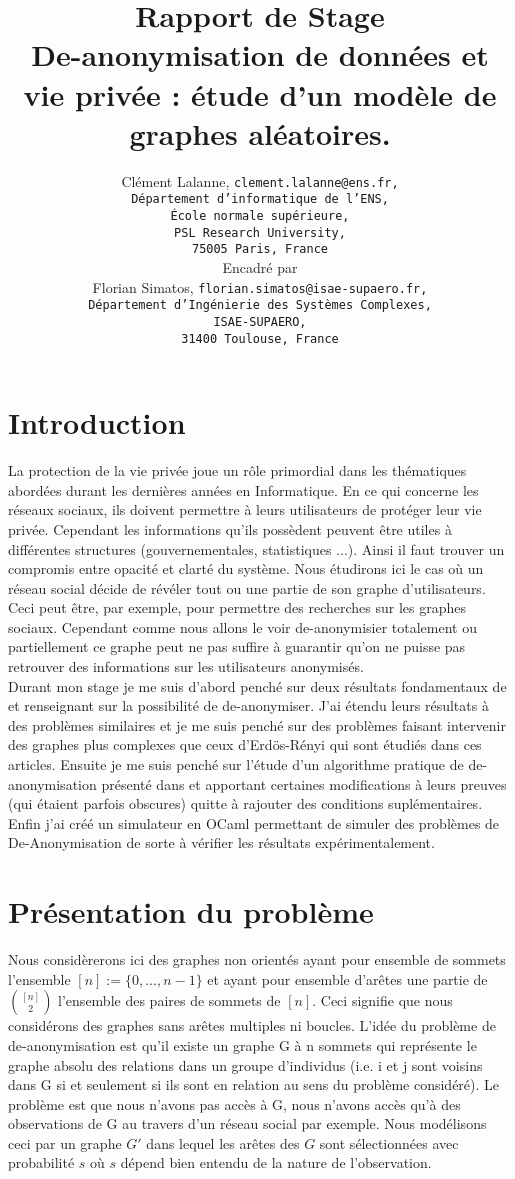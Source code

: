 \documentclass[letterpaper,10pt]{llncs}
\title{Rapport de Stage \\ De-anonymisation de données et vie privée : étude d'un modèle de graphes aléatoires.}
\author{
  Clément Lalanne, \texttt{clement.lalanne@ens.fr, \\ D\'epartement d'informatique de l'ENS,\\ \'Ecole normale sup\'erieure,\\ PSL Research University,\\ 75005 Paris, France}
\\ Encadré par 
\\ Florian Simatos, \texttt{florian.simatos@isae-supaero.fr, \\ D\'epartement d'Ing\'enierie des Systèmes Complexes, \\ ISAE-SUPAERO, \\ 31400 Toulouse, France}
}
\institute{}
\begin{document}
\maketitle 

\section*{Introduction}

La protection de la vie privée joue un rôle primordial dans les thématiques abordées durant les dernières années en Informatique. En ce qui concerne les réseaux sociaux, ils doivent permettre à leurs utilisateurs de protéger leur vie privée. Cependant les informations qu'ils possèdent peuvent être utiles à différentes structures (gouvernementales, statistiques ...). Ainsi il faut trouver un compromis entre opacité et clarté du système. Nous étudirons ici le cas où un réseau social décide de révéler tout ou une partie de son graphe d'utilisateurs. Ceci peut  être, par exemple, pour permettre des recherches sur les graphes sociaux. Cependant comme nous allons le voir de-anonymisier totalement ou partiellement ce graphe peut ne pas suffire à guarantir qu'on ne puisse pas retrouver des informations sur les utilisateurs anonymisés. \\

Durant mon stage je me suis d'abord penché sur deux résultats fondamentaux de \cite{Pedarsani:2011:PAN:2020408.2020596} et \cite{Cullina:2016:IAC:2964791.2901460} renseignant sur la possibilité de de-anonymiser. J'ai étendu leurs résultats à des problèmes similaires et je me suis penché sur des problèmes faisant intervenir des graphes plus complexes que ceux d'Erdös-Rényi qui sont étudiés dans ces articles. Ensuite je me suis penché sur l'étude d'un algorithme pratique de de-anonymisation présenté dans \cite{Korula:2014:ERA:2732269.2732274} et apportant certaines modifications à leurs preuves (qui étaient parfois obscures) quitte à rajouter des conditions suplémentaires. Enfin j'ai créé un simulateur en OCaml permettant de simuler des problèmes de De-Anonymisation de sorte à vérifier les résultats expérimentalement. 

\section{Présentation du problème}

Nous considèrerons ici des graphes non orientés ayant pour ensemble de sommets l'ensemble $[n] := \{0, ..., n-1\}$ et ayant pour ensemble d'arêtes une partie de $\binom{[n]}{2}$ l'ensemble des paires de sommets de $[n]$. Ceci signifie que nous considérons des graphes sans arêtes multiples ni boucles. L'idée du problème de de-anonymisation est qu'il existe un graphe G à n sommets qui représente le graphe absolu des relations dans un groupe d'individus (i.e. i et j sont voisins dans G si et seulement si ils sont en relation au sens du problème considéré). Le problème est que nous n'avons pas accès à G, nous n'avons accès qu'à des observations de G au travers d'un réseau social par exemple. Nous modélisons ceci par un graphe $G'$ dans lequel les arêtes des $G$ sont sélectionnées avec probabilité $s$ où $s$ dépend bien entendu de la nature de l'observation.
\end{document}
